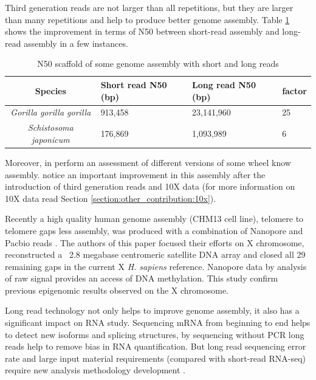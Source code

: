 \documentclass[main]{subfiles}
\begin{document}
Third generation reads are not larger than all repetitions, but they are larger than many repetitions and help to produce better genome assembly. Table \ref{intro:tab:sr_lr_assembly} shows the improvement in terms of N50 between short-read assembly and long-read assembly in a few instances. 

\begin{table}[]
    \centering
    \begin{tabular}{c|lll}
        Species & Short read N50 (bp) & Long read N50 (bp) & factor \\ \hline
        \textit{Gorilla gorilla gorilla} & 913,458 \cite{gorilla_sr_assembly} & 23,141,960 \cite{gorilla_genome} & 25 \\
        \textit{Schistosoma japonicum} & 176,869 \cite{s_japonicum_sr_assembly} & 1,093,989 \cite{s_japonicum_3rd_gene_improvement} & 6 \\
    \end{tabular}
    \caption{N50 scaffold of some genome assembly with short and long reads}
    \label{intro:tab:sr_lr_assembly}
\end{table}

Moreover, \citeauthor{dnAQET} in \cite{dnAQET} perform an assessment of different versions of some wheel know assembly. \citeauthor{dnAQET} notice an important improvement in this assembly after the introduction of third generation reads and 10X data (for more information on 10X data read Section \ref{section:other_contribution:10x}).

Recently a high quality human genome assembly (CHM13 cell line), telomere to telomere gaps less assembly, was produced with a combination of Nanopore and Pacbio reads \cite{telomere2telomere}. The authors of this paper focused their efforts on X chromosome, reconstructed a ~2.8 megabase centromeric satellite DNA array and closed all 29 remaining gaps in the current X \textit{H. sapiens} reference. Nanopore data by analysis of raw signal provides an access of DNA methylation. This study confirm previous epigenomic results observed on the X chromosome.

Long read technology not only helps to improve genome assembly, it also has a significant impact on RNA study. Sequencing mRNA from beginning to end helps to detect new isoforms and splicing structures, by sequencing without PCR long reads help to remove bias in RNA quantification. But long read sequencing error rate and large input material requirements (compared with short-read RNA-seq) require new analysis methodology development \cite{review_lr_rna}. 
\end{document}
